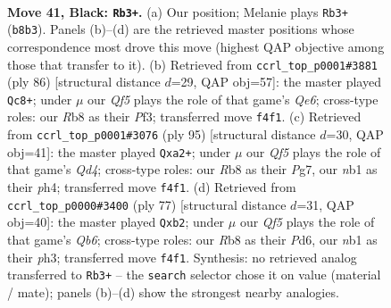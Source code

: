 \documentclass[11pt]{article}
\begin{document}
\clearpage

\begin{figure}[p]\centering
\begin{subfigure}{0.46\textwidth}\centering
\resizebox{\linewidth}{!}{%
\newchessgame
\chessboard[
  setfen={1r4k1/2p2p2/8/2Q3P1/2P1Pq2/7K/8/1N6 b - - 2 41},
  showmover=false,
  pgfstyle=straightmove, color=movearrow, markmove={b8-b3}
]}
\caption{}
\end{subfigure}\hfill
\begin{subfigure}{0.46\textwidth}\centering
\resizebox{\linewidth}{!}{%
\newchessgame
\chessboard[
  setfen={5k2/4p2p/4Qp2/8/6Pq/5P2/5PK1/8 w - - 7 44},
  showmover=false,
  pgfstyle=straightmove, color=movearrow, markmove={e6-c8}
]}
\caption{}
\end{subfigure}
\\[4pt]
\begin{subfigure}{0.46\textwidth}\centering
\resizebox{\linewidth}{!}{%
\newchessgame
\chessboard[
  setfen={8/5kp1/8/3q4/pQ1P3P/5P2/P3K3/8 b - - 0 48},
  showmover=false,
  pgfstyle=straightmove, color=movearrow, markmove={d5-a2}
]}
\caption{}
\end{subfigure}\hfill
\begin{subfigure}{0.46\textwidth}\centering
\resizebox{\linewidth}{!}{%
\newchessgame
\chessboard[
  setfen={5k2/1p3p2/3p4/Q7/P7/1q5P/1P4PK/8 b - - 0 39},
  showmover=false,
  pgfstyle=straightmove, color=movearrow, markmove={b3-b2}
]}
\caption{}
\end{subfigure}
\caption{\textbf{Move 41, Black: \texttt{Rb3+}.} (a) Our position; Melanie plays \texttt{Rb3+} (\texttt{b8b3}). Panels (b)--(d) are the retrieved master positions whose correspondence most drove this move (highest QAP objective among those that transfer to it). (b) Retrieved from \texttt{ccrl\_top\_p0001\#3881} (ply 86) [structural distance $d$=29, QAP obj=57]: the master played \texttt{Qc8+}; under $\mu$ our \emph{Qf5} plays the role of that game's \emph{Qe6}; cross-type roles: our \emph{R}b8 as their \emph{P}f3; transferred move \texttt{f4f1}. (c) Retrieved from \texttt{ccrl\_top\_p0001\#3076} (ply 95) [structural distance $d$=30, QAP obj=41]: the master played \texttt{Qxa2+}; under $\mu$ our \emph{Qf5} plays the role of that game's \emph{Qd4}; cross-type roles: our \emph{R}b8 as their \emph{P}g7, our \emph{n}b1 as their \emph{p}h4; transferred move \texttt{f4f1}. (d) Retrieved from \texttt{ccrl\_top\_p0000\#3400} (ply 77) [structural distance $d$=31, QAP obj=40]: the master played \texttt{Qxb2}; under $\mu$ our \emph{Qf5} plays the role of that game's \emph{Qb6}; cross-type roles: our \emph{R}b8 as their \emph{P}d6, our \emph{n}b1 as their \emph{p}h3; transferred move \texttt{f4f1}. Synthesis: no retrieved analog transferred to \texttt{Rb3+} -- the \texttt{search} selector chose it on value (material / mate); panels (b)--(d) show the strongest nearby analogies.}
\label{fig:thought-m81}
\end{figure}
\end{document}
